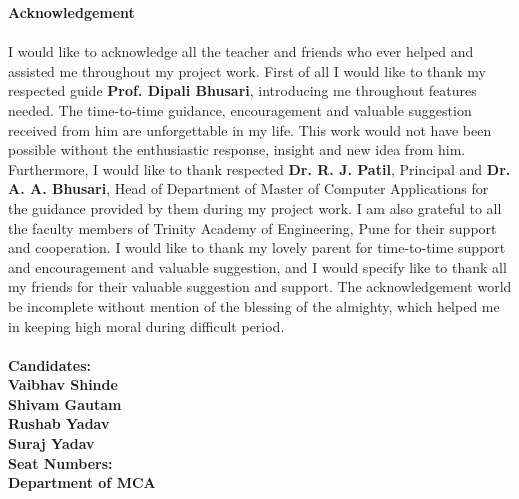 \begin{center}
\thispagestyle{plain}
\LARGE{\textbf{Acknowledgement}}\\[1cm]
\end{center}
\linespread{1.13}
\large{\paragraph{}
I would like to acknowledge all the teacher and friends who ever helped and assisted me throughout my project work.\newline \newline
First of all I would like to thank my respected guide \textbf {Prof. Dipali Bhusari}, introducing me throughout features needed. The time-to-time guidance, encouragement and valuable suggestion received from him are unforgettable in my life. This work would not have been possible without the enthusiastic response, insight and new idea from him.\newline \newline
Furthermore, I would like to thank respected \textbf{Dr. R. J. Patil}, Principal and  \textbf{Dr. A. A. Bhusari}, Head of Department of Master of Computer Applications for the guidance provided by them during my project work. I am also grateful to all the faculty members of Trinity Academy of Engineering, Pune for their support and cooperation. I would like to thank my lovely parent for time-to-time support and encouragement and valuable suggestion, and I would specify like to thank all my friends for their valuable suggestion and support. The acknowledgement world be incomplete without mention of the blessing of the almighty, which helped me in keeping high moral during difficult period.
}
\large{\paragraph{}
}
\begin{flushright}
    \begin{minipage}{0.45\textwidth}
        \textbf{Candidates:}\\[0.5cm]
        \textbf{Vaibhav  Shinde}\\
        \textbf{Shivam Gautam}\\
        \textbf{Rushab Yadav}\\
        \textbf{Suraj Yadav}\\[0.8cm]
        \textbf{Seat Numbers: \hrulefill}\\
        \textbf{Department of MCA}
    \end{minipage}
\end{flushright}
